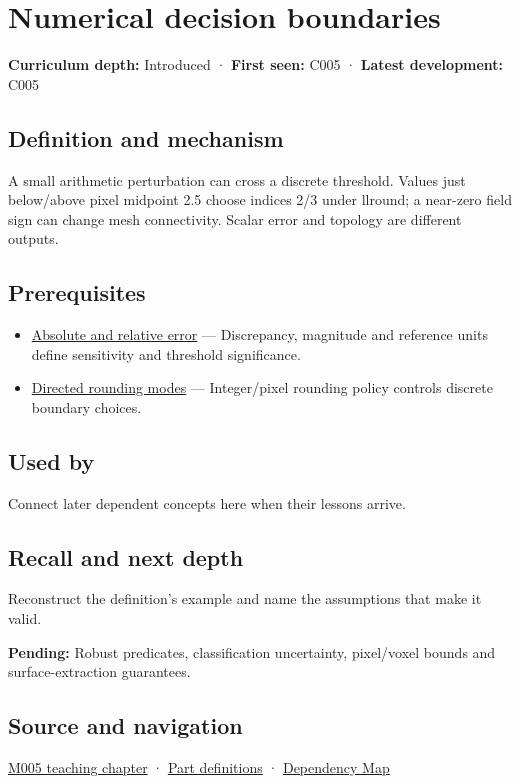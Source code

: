 \hypertarget{appendix-c80db39080be}{}\label{referencestart:appendix-c80db39080be}
\section{Numerical decision boundaries}\label{appendix-c80db39080be-numerical-decision-boundaries}

\textbf{Curriculum depth:} Introduced · \textbf{First seen:} C005 · \textbf{Latest development:} C005

\subsection{Definition and mechanism}\label{appendix-c80db39080be-definition-and-mechanism}

A small arithmetic perturbation can cross a discrete threshold. Values just below/above pixel midpoint 2.5 choose indices 2/3 under llround; a near-zero field sign can change mesh connectivity. Scalar error and topology are different outputs.

\subsection{Prerequisites}\label{appendix-c80db39080be-prerequisites}

\begin{itemize}
\tightlist
\item
  \hyperref[appendix-3ae74e89b4e6]{Absolute and relative error} --- Discrepancy, magnitude and reference units define sensitivity and threshold significance.
\item
  \hyperref[appendix-637d164ae5ca]{Directed rounding modes} --- Integer/pixel rounding policy controls discrete boundary choices.
\end{itemize}

\subsection{Used by}\label{appendix-c80db39080be-used-by}

Connect later dependent concepts here when their lessons arrive.

\subsection{Recall and next depth}\label{appendix-c80db39080be-recall-and-next-depth}

Reconstruct the definition's example and name the assumptions that make it valid.

\textbf{Pending:} Robust predicates, classification uncertainty, pixel/voxel bounds and surface-extraction guarantees.

\subsection{Source and navigation}\label{appendix-c80db39080be-source-and-navigation}

\hyperref[01-foundations-i-ch001-when-arithmetic-meets-uncertainty]{M005 teaching chapter} · \hyperref[appendix-fd090d982a15-m005---parts-77-88]{Part definitions} · \hyperref[appendix-4ad47bdd269a]{Dependency Map}

